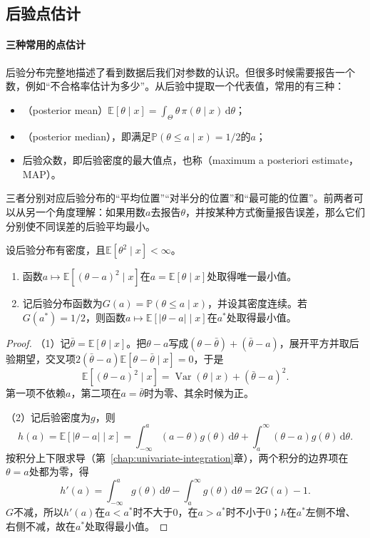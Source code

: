 \subsection{后验点估计}

\paragraph{三种常用的点估计}
后验分布完整地描述了看到数据后我们对参数的认识。但很多时候需要报告一个数，例如“不合格率估计为多少”。从后验中提取一个代表值，常用的有三种：
\begin{itemize}
  \item {}（posterior mean）$\mathbb{E}[\theta\mid x]=\int_\Theta\theta\,\pi(\theta\mid x)\,\mathrm{d}\theta$；
  \item {}（posterior median），即满足$\mathbb{P}(\theta\le a\mid x)=1/2$的$a$；
  \item 后验众数，即后验密度的最大值点，也称（maximum a posteriori estimate，MAP）。
\end{itemize}
三者分别对应后验分布的“平均位置”“对半分的位置”和“最可能的位置”。前两者可以从另一个角度理解：如果用数$a$去报告$\theta$，并按某种方式衡量报告误差，那么它们分别使不同误差的后验平均最小。

\begin{theorem}[后验均值与后验中位数的最优性]
\label{thm:est-posterior-mean-median}
设后验分布有密度，且$\mathbb{E}[\theta^2\mid x]<\infty$。
\begin{enumerate}
  \item 函数$a\mapsto\mathbb{E}[(\theta-a)^2\mid x]$在$a=\mathbb{E}[\theta\mid x]$处取得唯一最小值。
  \item 记后验分布函数为$G(a)=\mathbb{P}(\theta\le a\mid x)$，并设其密度连续。若$G(a^\ast)=1/2$，则函数$a\mapsto\mathbb{E}[|\theta-a|\mid x]$在$a^\ast$处取得最小值。
\end{enumerate}
\end{theorem}

\begin{proof}
（1）记$\bar\theta=\mathbb{E}[\theta\mid x]$。把$\theta-a$写成$(\theta-\bar\theta)+(\bar\theta-a)$，展开平方并取后验期望，交叉项$2(\bar\theta-a)\mathbb{E}[\theta-\bar\theta\mid x]=0$，于是
\[
\mathbb{E}[(\theta-a)^2\mid x]=\operatorname{Var}(\theta\mid x)+(\bar\theta-a)^2 .
\]
第一项不依赖$a$，第二项在$a=\bar\theta$时为零、其余时候为正。

（2）记后验密度为$g$，则
\[
h(a)=\mathbb{E}[|\theta-a|\mid x]=\int_{-\infty}^a(a-\theta)g(\theta)\,\mathrm{d}\theta+\int_a^{\infty}(\theta-a)g(\theta)\,\mathrm{d}\theta .
\]
按积分上下限求导（第~\ref{chap:univariate-integration}章），两个积分的边界项在$\theta=a$处都为零，得
\[
h'(a)=\int_{-\infty}^a g(\theta)\,\mathrm{d}\theta-\int_a^{\infty}g(\theta)\,\mathrm{d}\theta=2G(a)-1 .
\]
$G$不减，所以$h'(a)$在$a<a^\ast$时不大于$0$，在$a>a^\ast$时不小于$0$；$h$在$a^\ast$左侧不增、右侧不减，故在$a^\ast$处取得最小值。
\end{proof}

